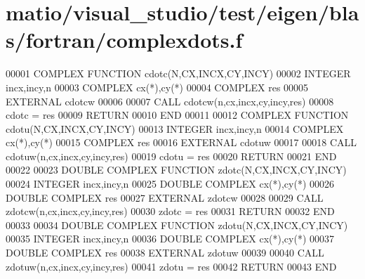 \hypertarget{matio_2visual__studio_2test_2eigen_2blas_2fortran_2complexdots_8f_source}{}\section{matio/visual\+\_\+studio/test/eigen/blas/fortran/complexdots.f}
\label{matio_2visual__studio_2test_2eigen_2blas_2fortran_2complexdots_8f_source}

\begin{DoxyCode}
00001 \textcolor{keyword}{      COMPLEX }\textcolor{keyword}{FUNCTION }cdotc(N,CX,INCX,CY,INCY)
00002       \textcolor{keywordtype}{INTEGER} incx,incy,n
00003       \textcolor{keywordtype}{COMPLEX} cx(*),cy(*)
00004       \textcolor{keywordtype}{COMPLEX} res
00005       \textcolor{keywordtype}{EXTERNAL} cdotcw
00006       
00007       \textcolor{keyword}{CALL }cdotcw(n,cx,incx,cy,incy,res)
00008       cdotc = res
00009       \textcolor{keywordflow}{RETURN}
00010 \textcolor{keyword}{      END}
00011       
00012 \textcolor{keyword}{      COMPLEX }\textcolor{keyword}{FUNCTION }cdotu(N,CX,INCX,CY,INCY)
00013       \textcolor{keywordtype}{INTEGER} incx,incy,n
00014       \textcolor{keywordtype}{COMPLEX} cx(*),cy(*)
00015       \textcolor{keywordtype}{COMPLEX} res
00016       \textcolor{keywordtype}{EXTERNAL} cdotuw
00017       
00018       \textcolor{keyword}{CALL }cdotuw(n,cx,incx,cy,incy,res)
00019       cdotu = res
00020       \textcolor{keywordflow}{RETURN}
00021 \textcolor{keyword}{      END}
00022       
00023 \textcolor{keyword}{      DOUBLE COMPLEX }\textcolor{keyword}{FUNCTION }zdotc(N,CX,INCX,CY,INCY)
00024       \textcolor{keywordtype}{INTEGER} incx,incy,n
00025       \textcolor{keywordtype}{DOUBLE COMPLEX} cx(*),cy(*)
00026       \textcolor{keywordtype}{DOUBLE COMPLEX} res
00027       \textcolor{keywordtype}{EXTERNAL} zdotcw
00028       
00029       \textcolor{keyword}{CALL }zdotcw(n,cx,incx,cy,incy,res)
00030       zdotc = res
00031       \textcolor{keywordflow}{RETURN}
00032 \textcolor{keyword}{      END}
00033       
00034 \textcolor{keyword}{      DOUBLE COMPLEX }\textcolor{keyword}{FUNCTION }zdotu(N,CX,INCX,CY,INCY)
00035       \textcolor{keywordtype}{INTEGER} incx,incy,n
00036       \textcolor{keywordtype}{DOUBLE COMPLEX} cx(*),cy(*)
00037       \textcolor{keywordtype}{DOUBLE COMPLEX} res
00038       \textcolor{keywordtype}{EXTERNAL} zdotuw
00039       
00040       \textcolor{keyword}{CALL }zdotuw(n,cx,incx,cy,incy,res)
00041       zdotu = res
00042       \textcolor{keywordflow}{RETURN}
00043 \textcolor{keyword}{      END}
\end{DoxyCode}
